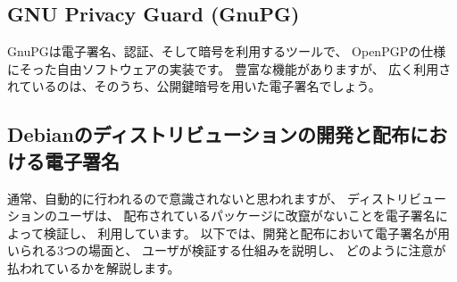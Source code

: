 \documentclass[mingoth,a4paper,twoside]{jsarticle}
\begin{document}

\subsection{GNU Privacy Guard (GnuPG)}
GnuPGは電子署名、認証、そして暗号を利用するツールで、
OpenPGPの仕様\cite{openpgp}にそった自由ソフトウェアの実装です。
豊富な機能がありますが、
広く利用されているのは、そのうち、公開鍵暗号を用いた電子署名でしょう。

\subsection{Debianのディストリビューションの開発と配布における電子署名}

通常、自動的に行われるので意識されないと思われますが、
ディストリビューションのユーザは、
配布されているパッケージに改竄がないことを電子署名によって検証し、
利用しています。
%
以下では、開発と配布において電子署名が用いられる3つの場面と、
ユーザが検証する仕組みを説明し、
どのように注意が払われているかを解説します。
\end{document}
